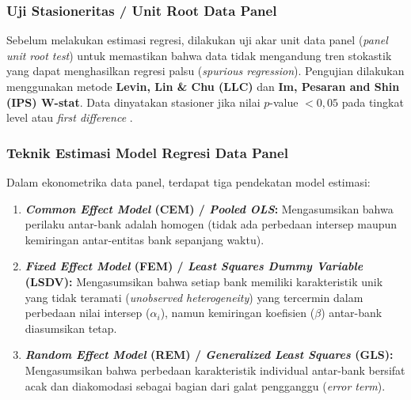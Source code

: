 \documentclass[12pt,a4paper]{article}
\numberwithin{equation}{section}
\begin{document}
\subsubsection{Uji Stasioneritas / Unit Root Data Panel}
\noindent
Sebelum melakukan estimasi regresi, dilakukan uji akar unit data panel (\emph{panel unit root test}) untuk memastikan bahwa data tidak mengandung tren stokastik yang dapat menghasilkan regresi palsu (\emph{spurious regression}). Pengujian dilakukan menggunakan metode \textbf{Levin, Lin \& Chu (LLC)} dan \textbf{Im, Pesaran and Shin (IPS) W-stat}. Data dinyatakan stasioner jika nilai $p$-value $< 0{,}05$ pada tingkat level atau \emph{first difference} \citep{GujaratiPorter2020}.

\subsubsection{Teknik Estimasi Model Regresi Data Panel}
\noindent
Dalam ekonometrika data panel, terdapat tiga pendekatan model estimasi:
\begin{enumerate}
  \item \textbf{\emph{Common Effect Model} (CEM) / \emph{Pooled OLS}:} Mengasumsikan bahwa perilaku antar-bank adalah homogen (tidak ada perbedaan intersep maupun kemiringan antar-entitas bank sepanjang waktu).
  \item \textbf{\emph{Fixed Effect Model} (FEM) / \emph{Least Squares Dummy Variable} (LSDV):} Mengasumsikan bahwa setiap bank memiliki karakteristik unik yang tidak teramati (\emph{unobserved heterogeneity}) yang tercermin dalam perbedaan nilai intersep ($\alpha_i$), namun kemiringan koefisien ($\beta$) antar-bank diasumsikan tetap.
  \item \textbf{\emph{Random Effect Model} (REM) / \emph{Generalized Least Squares} (GLS):} Mengasumsikan bahwa perbedaan karakteristik individual antar-bank bersifat acak dan diakomodasi sebagai bagian dari galat pengganggu (\emph{error term}).
\end{enumerate}
\end{document}
